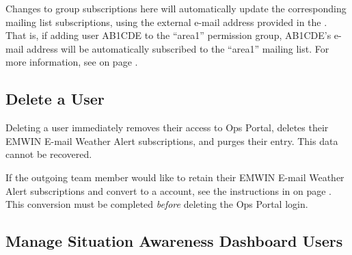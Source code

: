 \documentclass[pdflatex,letterpaper,twoside,12pt]{book}
\begin{document}

Changes to group subscriptions here will automatically update the corresponding mailing list subscriptions, using the external e-mail address provided in the .  That is, if adding user AB1CDE to the ``area1'' permission group, AB1CDE's e-mail address will be automatically subscribed to the ``area1'' mailing list.  For more information, see  on page \pageref{mailing-lists}.

\subsection{Delete a User}\label{ops-delete-user}

Deleting a user immediately removes their access to Ops Portal, deletes their EMWIN E-mail Weather Alert subscriptions, and purges their  entry.  This data cannot be recovered.

If the outgoing team member would like to retain their EMWIN E-mail Weather Alert subscriptions and convert to a  account, see the instructions in  on page \pageref{sit-account-conversion}.  This conversion must be completed \emph{before} deleting the Ops Portal login.

\subsection{Manage Situation Awareness Dashboard Users}\label{ops-manage-situation}
\end{document}
